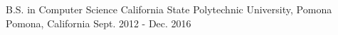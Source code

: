 

\begin{cventries}

  \cventryedu
    {B.S. in Computer Science} %
    {California State Polytechnic University, Pomona} %
    {Pomona, California} %
    {Sept. 2012 - Dec. 2016} %
\end{cventries}
